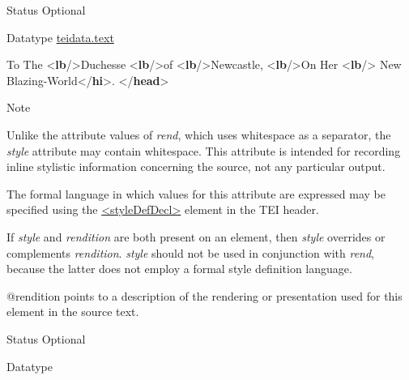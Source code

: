 \begin{reflist}
\begin{sansreflist}
\begin{reflist}
    \item[{Status}]
  Optional
    \item[{Datatype}]
  \hyperref[TEI.teidata.text]{teidata.text}
    \item[]\mbox{}\newline 
{}To The {<\textbf{lb}/>}Duchesse {<\textbf{lb}/>}of {<\textbf{lb}/>}Newcastle, {<\textbf{lb}/>}On Her\mbox{}\newline 
{<\textbf{lb}/>}\mbox{}\newline 
{}New Blazing-World{</\textbf{hi}>}. \mbox{}\newline 
{</\textbf{head}>}
    \item[{Note}]
  \par
Unlike the attribute values of {\itshape rend}, which uses whitespace as a separator, the {\itshape style} attribute may contain whitespace. This attribute is intended for recording inline stylistic information concerning the source, not any particular output.\par
The formal language in which values for this attribute are expressed may be specified using the \hyperref[TEI.styleDefDecl]{<styleDefDecl>} element in the TEI header.\par
If {\itshape style} and {\itshape rendition} are both present on an element, then {\itshape style} overrides or complements {\itshape rendition}. {\itshape style} should not be used in conjunction with {\itshape rend}, because the latter does not employ a formal style definition language.
\end{reflist}  
    \item[@rendition]
  points to a description of the rendering or presentation used for this element in the source text.
\begin{reflist}
    \item[{Status}]
  Optional
    \item[{Datatype}]

\end{reflist}
\end{sansreflist}
\end{reflist}
